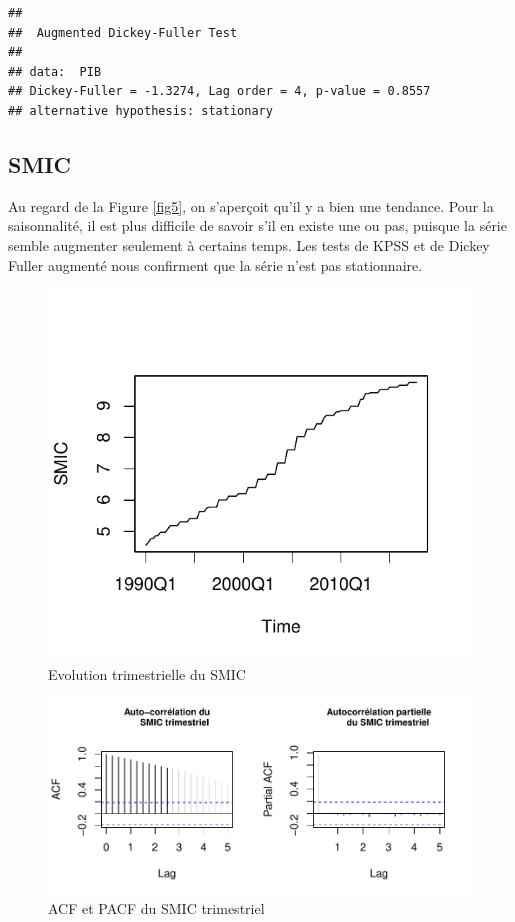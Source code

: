 \documentclass[11pt,]{article}
\begin{document}
\begin{verbatim}
## 
##  Augmented Dickey-Fuller Test
## 
## data:  PIB
## Dickey-Fuller = -1.3274, Lag order = 4, p-value = 0.8557
## alternative hypothesis: stationary
\end{verbatim}

\subsection{SMIC}\label{smic}

Au regard de la Figure \ref{fig5}, on s'aperçoit qu'il y a bien une
tendance. Pour la saisonnalité, il est plus difficile de savoir s'il en
existe une ou pas, puisque la série semble augmenter seulement à
certains temps. Les tests de KPSS et de Dickey Fuller augmenté nous
confirment que la série n'est pas stationnaire.

\begin{figure}

{\centering \includegraphics{doc_files/figure-latex/unnamed-chunk-5-1} 

}

\caption{\label{fig5} Evolution trimestrielle du SMIC}\label{fig:unnamed-chunk-5}
\end{figure}

\begin{figure}[htbp]
\centering
\includegraphics{doc_files/figure-latex/unnamed-chunk-6-1.pdf}
\caption{\label{fig6} ACF et PACF du SMIC trimestriel}
\end{figure}
\end{document}
